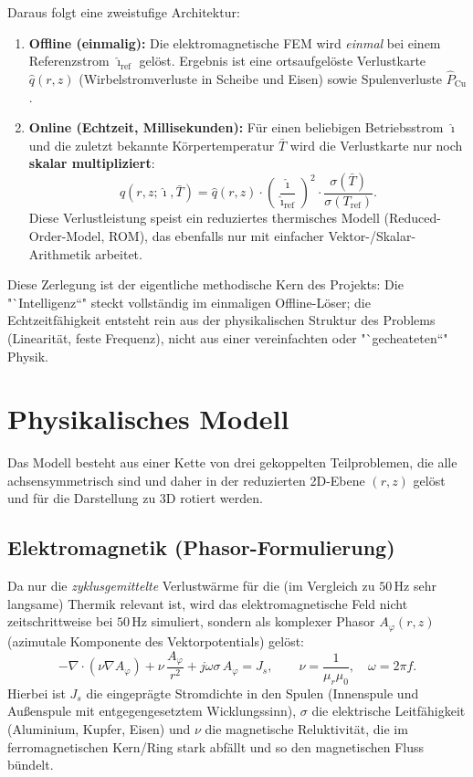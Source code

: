 \documentclass[a4paper,11pt]{article}
\begin{document}
Daraus folgt eine zweistufige Architektur:
\begin{enumerate}[nosep]
  \item \textbf{Offline (einmalig):} Die elektromagnetische FEM wird
        \emph{einmal} bei einem Referenzstrom $\hat{\imath}_{\mathrm{ref}}$
        gelöst. Ergebnis ist eine ortsaufgelöste Verlustkarte
        $\hat{q}(r,z)$ (Wirbelstromverluste in Scheibe und Eisen) sowie
        Spulenverluste $\hat{P}_{\mathrm{Cu}}$.
  \item \textbf{Online (Echtzeit, Millisekunden):} Für einen beliebigen
        Betriebsstrom $\hat{\imath}$ und die zuletzt bekannte
        Körpertemperatur $\bar T$ wird die Verlustkarte nur noch
        \textbf{skalar multipliziert}:
        \[
          q(r,z;\hat{\imath},\bar T) = \hat q(r,z)\cdot
          \left(\frac{\hat{\imath}}{\hat{\imath}_{\mathrm{ref}}}\right)^{2}
          \cdot \frac{\sigma(\bar T)}{\sigma(T_{\mathrm{ref}})}.
        \]
        Diese Verlustleistung speist ein reduziertes thermisches Modell
        (Reduced-Order-Model, ROM), das ebenfalls nur mit einfacher
        Vektor-/Skalar-Arithmetik arbeitet.
\end{enumerate}

Diese Zerlegung ist der eigentliche methodische Kern des Projekts: Die
"`Intelligenz“" steckt vollständig im einmaligen Offline-Löser; die
Echtzeitfähigkeit entsteht rein aus der physikalischen Struktur des Problems
(Linearität, feste Frequenz), nicht aus einer vereinfachten oder
"`gecheateten“" Physik.

\section{Physikalisches Modell}

Das Modell besteht aus einer Kette von drei gekoppelten Teilproblemen, die
alle achsensymmetrisch sind und daher in der reduzierten 2D-Ebene $(r,z)$
gelöst und für die Darstellung zu 3D rotiert werden.

\subsection{Elektromagnetik (Phasor-Formulierung)}
Da nur die \emph{zyklusgemittelte} Verlustwärme für die (im Vergleich zu
$50\,\mathrm{Hz}$ sehr langsame) Thermik relevant ist, wird das
elektromagnetische Feld nicht zeitschrittweise bei $50\,\mathrm{Hz}$
simuliert, sondern als komplexer Phasor $A_\varphi(r,z)$ (azimutale
Komponente des Vektorpotentials) gelöst:
\[
  -\nabla\!\cdot\!\left(\nu \nabla A_\varphi\right)
  + \nu\,\frac{A_\varphi}{r^{2}}
  + j\omega\sigma\, A_\varphi = J_s ,
  \qquad \nu = \frac{1}{\mu_r \mu_0},\quad \omega = 2\pi f .
\]
Hierbei ist $J_s$ die eingeprägte Stromdichte in den Spulen (Innenspule und
Außenspule mit entgegengesetztem Wicklungssinn), $\sigma$ die elektrische
Leitfähigkeit (Aluminium, Kupfer, Eisen) und $\nu$ die magnetische
Reluktivität, die im ferromagnetischen Kern/Ring stark abfällt und so den
magnetischen Fluss bündelt.
\end{document}
